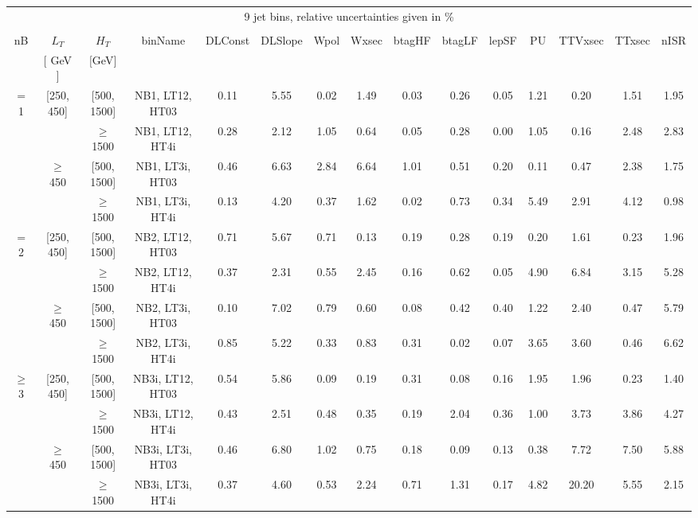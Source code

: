 \begin{table}[ht]
\begin{center}
\begin{tabular}{|c | c | c | c | c | c | c | c | c | c | c | c | c | c | c | }
 \hline 
\multicolumn{15}{|c|}{9 jet bins, relative uncertainties given in \%} \\ 
\multicolumn{15}{|c|}{} \\ \hline 
nB &  $L_T$ & $H_T$ & binName & DLConst & DLSlope & Wpol & Wxsec & btagHF & btagLF & lepSF & PU & TTVxsec & TTxsec & nISR  \\ 
   & $[$ GeV $]$  &  $[$GeV$]$  &  &  &  &  &  &  &  &  &  &  &  &   \\ \hline 
\cline{1-15} $=$ 1 & [250, 450] & [500, 1500]&NB1, LT12, HT03 & 0.11 & 5.55 & 0.02 & 1.49 & 0.03 & 0.26 & 0.05 & 1.21 & 0.20 & 1.51 & 1.95 \\ 
\cline{3-15}  & & $\geq$ 1500 &NB1, LT12, HT4i & 0.28 & 2.12 & 1.05 & 0.64 & 0.05 & 0.28 & 0.00 & 1.05 & 0.16 & 2.48 & 2.83 \\ 
\cline{2-15}   & $\geq$ 450 & [500, 1500]&NB1, LT3i, HT03 & 0.46 & 6.63 & 2.84 & 6.64 & 1.01 & 0.51 & 0.20 & 0.11 & 0.47 & 2.38 & 1.75 \\ 
\cline{3-15}  & & $\geq$ 1500 &NB1, LT3i, HT4i & 0.13 & 4.20 & 0.37 & 1.62 & 0.02 & 0.73 & 0.34 & 5.49 & 2.91 & 4.12 & 0.98 \\ 
\cline{1-15} $=$ 2 & [250, 450] & [500, 1500]&NB2, LT12, HT03 & 0.71 & 5.67 & 0.71 & 0.13 & 0.19 & 0.28 & 0.19 & 0.20 & 1.61 & 0.23 & 1.96 \\ 
\cline{3-15}  & & $\geq$ 1500 &NB2, LT12, HT4i & 0.37 & 2.31 & 0.55 & 2.45 & 0.16 & 0.62 & 0.05 & 4.90 & 6.84 & 3.15 & 5.28 \\ 
\cline{2-15}   & $\geq$ 450 & [500, 1500]&NB2, LT3i, HT03 & 0.10 & 7.02 & 0.79 & 0.60 & 0.08 & 0.42 & 0.40 & 1.22 & 2.40 & 0.47 & 5.79 \\ 
\cline{3-15}  & & $\geq$ 1500 &NB2, LT3i, HT4i & 0.85 & 5.22 & 0.33 & 0.83 & 0.31 & 0.02 & 0.07 & 3.65 & 3.60 & 0.46 & 6.62 \\ 
\cline{1-15} $\geq$ 3 & [250, 450] & [500, 1500]&NB3i, LT12, HT03 & 0.54 & 5.86 & 0.09 & 0.19 & 0.31 & 0.08 & 0.16 & 1.95 & 1.96 & 0.23 & 1.40 \\ 
\cline{3-15}  & & $\geq$ 1500 &NB3i, LT12, HT4i & 0.43 & 2.51 & 0.48 & 0.35 & 0.19 & 2.04 & 0.36 & 1.00 & 3.73 & 3.86 & 4.27 \\ 
\cline{2-15}   & $\geq$ 450 & [500, 1500]&NB3i, LT3i, HT03 & 0.46 & 6.80 & 1.02 & 0.75 & 0.18 & 0.09 & 0.13 & 0.38 & 7.72 & 7.50 & 5.88 \\ 
\cline{3-15}  & & $\geq$ 1500 &NB3i, LT3i, HT4i & 0.37 & 4.60 & 0.53 & 2.24 & 0.71 & 1.31 & 0.17 & 4.82 & 20.20 & 5.55 & 2.15 \\ 
 \hline 
\hline 
\end{tabular} 
\end{center} 
\end{table} 
